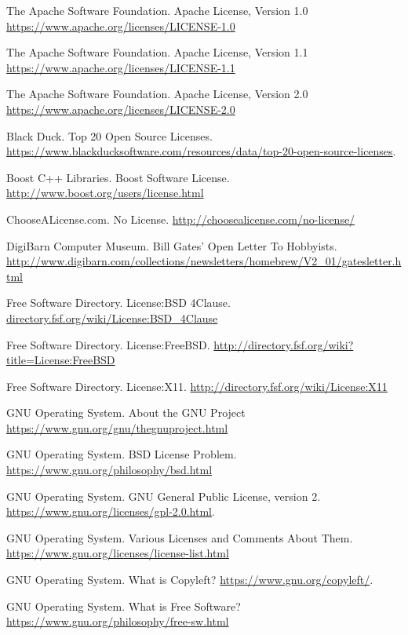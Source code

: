 \documentclass[12pt,letterpaper]{article}
\begin{document}
\begin{thebibliography}{20}

 The Apache Software Foundation. Apache License, Version 1.0 \url{https://www.apache.org/licenses/LICENSE-1.0}

 The Apache Software Foundation. Apache License, Version 1.1 \url{https://www.apache.org/licenses/LICENSE-1.1}

 The Apache Software Foundation. Apache License, Version 2.0 \url{https://www.apache.org/licenses/LICENSE-2.0}

 Black Duck. Top 20 Open Source Licenses. \url{https://www.blackducksoftware.com/resources/data/top-20-open-source-licenses}.

 Boost C++ Libraries. Boost Software License. \url{http://www.boost.org/users/license.html}

 ChooseALicense.com. No License. \url{http://choosealicense.com/no-license/}

 DigiBarn Computer Museum. Bill Gates' Open Letter To Hobbyists. \url{http://www.digibarn.com/collections/newsletters/homebrew/V2_01/gatesletter.html}

 Free Software Directory. License:BSD 4Clause. \url{directory.fsf.org/wiki/License:BSD_4Clause}

 Free Software Directory. License:FreeBSD. \url{http://directory.fsf.org/wiki?title=License:FreeBSD}

 Free Software Directory. License:X11. \url{http://directory.fsf.org/wiki/License:X11}

 GNU Operating System. About the GNU Project \url{https://www.gnu.org/gnu/thegnuproject.html}

 GNU Operating System. BSD License Problem. \url{https://www.gnu.org/philosophy/bsd.html}

 GNU Operating System. GNU General Public License, version 2. \url{https://www.gnu.org/licenses/gpl-2.0.html}.

 GNU Operating System. Various Licenses and Comments About Them. \url{https://www.gnu.org/licenses/license-list.html}

 GNU Operating System. What is Copyleft? \url{https://www.gnu.org/copyleft/}.

 GNU Operating System. What is Free Software? \url{https://www.gnu.org/philosophy/free-sw.html}


\end{thebibliography}
\end{document}
